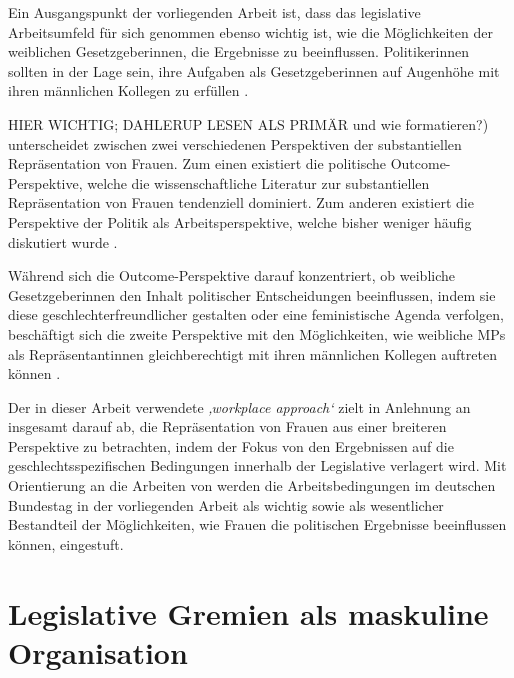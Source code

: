 \documentclass[12pt, 
    twoside=false, 
    bibliography=totoc, 
    numbers=endperiod, 
    headings=normal, 
    toc=chapterentrydotfill
    ]{scrbook}
\begin{document}
Ein Ausgangspunkt der vorliegenden Arbeit ist, dass das legislative Arbeitsumfeld für sich genommen ebenso wichtig ist, wie die Möglichkeiten der weiblichen Gesetzgeberinnen, die Ergebnisse zu beeinflussen. Politikerinnen sollten in der Lage sein, ihre Aufgaben als Gesetzgeberinnen auf Augenhöhe mit ihren männlichen Kollegen zu erfüllen \parencite[199]{erikson_2018}. 

\textcites{dahlerup_2006}{dahlerup_1988} HIER WICHTIG; DAHLERUP LESEN ALS PRIMÄR und wie formatieren?) unterscheidet zwischen zwei verschiedenen Perspektiven der substantiellen Repräsentation von Frauen. Zum einen existiert die politische Outcome-Perspektive, welche die wissenschaftliche Literatur zur substantiellen Repräsentation von Frauen tendenziell dominiert. Zum anderen existiert die Perspektive der Politik als Arbeitsperspektive, welche bisher weniger häufig diskutiert wurde \parencites[513]{dahlerup_2006}[199]{erikson_2018}. 

Während sich die Outcome-Perspektive darauf konzentriert, ob weibliche Gesetzgeberinnen den Inhalt politischer Entscheidungen beeinflussen, indem sie diese geschlechterfreundlicher gestalten oder eine feministische Agenda verfolgen, beschäftigt sich die zweite Perspektive mit den Möglichkeiten, wie weibliche MPs als Repräsentantinnen gleichberechtigt mit ihren männlichen Kollegen auftreten können \parencites[199]{erikson_2018}{dahlerup_2006}{dahlerup_1988}.

Der in dieser Arbeit verwendete \emph{‚workplace approach‘} zielt in Anlehnung an \textcite{erikson_2018} insgesamt darauf ab, die Repräsentation von Frauen aus einer breiteren Perspektive zu betrachten, indem der Fokus von den Ergebnissen auf die geschlechtsspezifischen Bedingungen innerhalb der Legislative verlagert wird. Mit Orientierung an die Arbeiten von \textcites{dahlerup_2006}{dahlerup_1988}{erikson_2018 } werden die  Arbeitsbedingungen im deutschen Bundestag in der vorliegenden Arbeit als wichtig sowie als wesentlicher Bestandteil der Möglichkeiten, wie Frauen die politischen Ergebnisse beeinflussen können, eingestuft.

\section{Legislative Gremien als maskuline Organisation }
\end{document}
